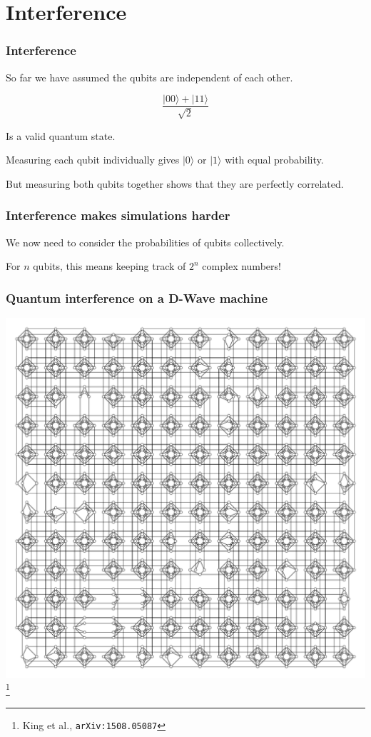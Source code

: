 \documentclass[notes]{beamer}
\begin{document}
\section{Interference}

\begin{frame}
\frametitle{Interference}

So far we have assumed the qubits are independent of each other.

$$\frac{|00\rangle + |11\rangle}{\sqrt{2}}$$

Is a valid quantum state.

Measuring each qubit individually gives $|0\rangle$ or $|1\rangle$ with equal probability.

But measuring both qubits together shows that they are perfectly correlated.

\end{frame}

\begin{frame}
\frametitle{Interference makes simulations harder}

We now need to consider the probabilities of qubits collectively.

For $n$ qubits, this means keeping track of $2^n$ complex numbers!
\end{frame}

\begin{frame}
\frametitle{Quantum interference on a D-Wave machine}
\begin{center}
\includegraphics[scale=0.25]{dwave2x}\footnote{King et al., {\tt arXiv:1508.05087}}
\end{center}
\end{frame}
\end{document}
